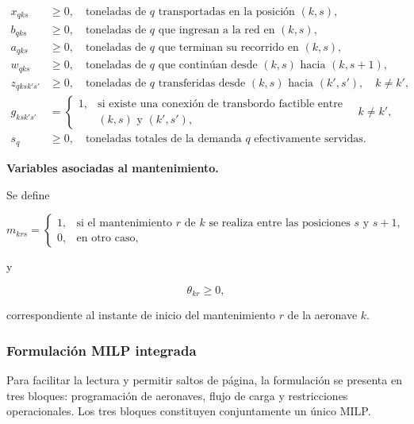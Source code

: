 \begin{align}
x_{qks}
&\geq0,
\quad
\text{toneladas de $q$ transportadas en la posición $(k,s)$},
\label{var:x}
\\
b_{qks}
&\geq0,
\quad
\text{toneladas de $q$ que ingresan a la red en $(k,s)$},
\label{var:b}
\\
a_{qks}
&\geq0,
\quad
\text{toneladas de $q$ que terminan su recorrido en $(k,s)$},
\label{var:a}
\\
w_{qks}
&\geq0,
\quad
\text{toneladas de $q$ que continúan desde $(k,s)$ hacia $(k,s+1)$},
\label{var:w}
\\
z_{qksk's'}
&\geq0,
\quad
\text{toneladas de $q$ transferidas desde $(k,s)$ hacia $(k',s')$},
\quad k\neq k',
\label{var:z}
\\
g_{ksk's'}
&=
\begin{cases}
1, & \text{si existe una conexión de transbordo factible entre}\\
   & \text{$(k,s)$ y $(k',s')$},
\end{cases}
\quad k\neq k',
\label{var:g}
\\
s_q
&\geq0,
\quad
\text{toneladas totales de la demanda $q$ efectivamente servidas}.
\label{var:s}
\end{align}


\vspace{0.5em}
\noindent\textbf{Variables asociadas al mantenimiento.}

Se define

\[
m_{krs}=
\begin{cases}
1, & \text{si el mantenimiento $r$ de $k$ se realiza entre las posiciones $s$ y $s+1$},\\
0, & \text{en otro caso},
\end{cases}
\]

y

\[
\theta_{kr}\geq0,
\]

correspondiente al instante de inicio del mantenimiento $r$ de la aeronave $k$.


\subsubsection{Formulación MILP integrada}
\label{app:modelo_milp}

Para facilitar la lectura y permitir saltos de página, la formulación se presenta en tres
bloques: programación de aeronaves, flujo de carga y restricciones operacionales. Los tres
bloques constituyen conjuntamente un único MILP.


